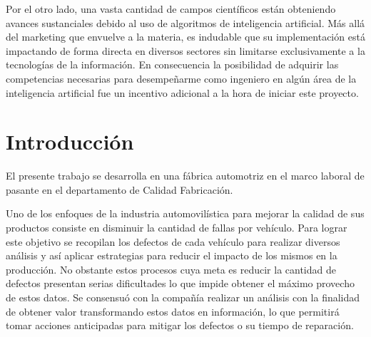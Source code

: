 \documentclass[a4paper,12pt]{article}
\begin{document}
Por el otro lado, una vasta cantidad de campos científicos están obteniendo avances sustanciales debido al uso de algoritmos de inteligencia artificial. Más allá del marketing que envuelve a la materia, es indudable que su implementación está impactando de forma directa en diversos sectores sin limitarse exclusivamente a la tecnologías de la información. En consecuencia la posibilidad de adquirir las competencias necesarias para desempeñarme como ingeniero en algún área de la inteligencia artificial fue un incentivo adicional a la hora de iniciar este proyecto.

%
%
\clearpage

\section{Introducción}
El presente trabajo se desarrolla en una fábrica automotriz en el marco laboral de pasante en el departamento de Calidad Fabricación.

Uno de los enfoques de la industria automovilística para mejorar la calidad de sus productos consiste en disminuir la cantidad de fallas por vehículo. Para lograr este objetivo se recopilan los defectos de cada vehículo para realizar diversos análisis y así aplicar estrategias para reducir el impacto de los mismos en la producción. No obstante estos procesos cuya meta es reducir la cantidad de defectos presentan serias dificultades lo que impide obtener el máximo provecho de estos datos. Se consensuó con la compañía realizar un análisis con la finalidad de obtener valor transformando estos datos en información, lo que permitirá tomar acciones anticipadas para mitigar los defectos o su tiempo de reparación.
\end{document}
